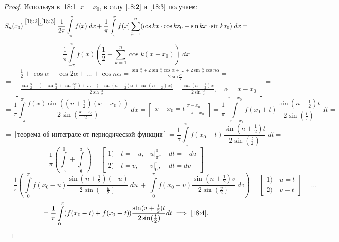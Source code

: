 \documentclass[../../main.tex]{subfiles}
\begin{document}
\begin{proof}
	Используя в \eqref{18:1} $x = x_0$, в силу $\eqref{18:2}$ и $\eqref{18:3}$ получаем:
	\[S_n(x_0) \stackrel{\eqref{18:2}, \eqref{18:3}}{=}
	\dfrac{1}{2\pi}\int\limits_{-\pi}^{\pi}{f(x)\; dx} + \dfrac{1}{\pi}
	\int\limits_{-\pi}^{\pi}{f(x)}\sum\limits_{k=1}^{n}
	(\cos{kx}\cdot \cos{kx}_0 + \sin{kx}\cdot \sin{kx}_0)\; dx = \]
	\[ = \dfrac{1}{\pi}\int\limits_{-\pi}^{\pi}f(x)\left(\dfrac{1}{2} + 
	\sum\limits_{k=1}^{n}\cos k(x-x_0)\right)\; dx =\]
	\[=\left[ 
	\begin{gathered} 
	\frac{1}{2} + \cos\alpha + \cos{2\alpha} + \ldots + \cos{n\alpha} =
	\frac{\sin\frac{\alpha}{2} + 2\sin{\frac{\alpha}{2}}\cos\alpha + \ldots +
	2\sin{\frac{\alpha}{2}}\cos{n \alpha}}{2\sin{\frac{\alpha}{2}}} =
	\\\frac{\sin{\frac{\alpha}{2} + (-\sin{\frac{\alpha}{2}}+
	\sin{\frac{3\alpha}{2}}) + \ldots + (-\sin(n-\frac{1}{2})\alpha + 
	\sin{(n + \frac{1}{2})\alpha)}}}{2\sin\frac{\alpha}{2}} = 
	\frac{\sin(n + \frac{1}{2})\alpha}{2\sin{\frac{\alpha}{2}}},\quad
	\alpha = x - x_0
	\end{gathered} 
	\right] = \]
	\[=\dfrac{1}{\pi}\int\limits_{-\pi}^{\pi}
	{\dfrac{f(x)\sin((n + \frac{1}{2})(x - x_0))}{2\sin\left(\frac{x-x_0}{2}\right)}}\; dx=
	\left[ 
	\begin{gathered} 
	x - x_0 = t\big|_{-\pi-x_0}^{\pi-x_0}
	\end{gathered} 
	\right]
	=\dfrac{1}{\pi}\int\limits_{-\pi-x_0}^{\pi - x_0}{f(x_0 + t)
	\dfrac{\sin(n + \frac{1}{2})t}{2\sin(\frac{t}{2})}}\; dt = \]
	\[=\left[
	\text{теорема об интеграле от периодической функции}
	\right] =
	\dfrac{1}{\pi}\int\limits_{-\pi}^{\pi}{f(x_0 + t)}
	\dfrac{\sin(n + \frac{1}{2})t}{2\sin(\frac{t}{2})}\; dt =\]
	\[= \dfrac{1}{\pi}\left(\int\limits_{-\pi}^{0} + \int\limits_{0}^{\pi}\right) =
	\left[ 
	\begin{aligned} 
	1)\ & t = -u,& u\big|_{\pi}^{0},\ &  dt = -du\\
	2)\ & t= v,& v\big|_{0}^{\pi},\ &  dt = dv
	\end{aligned} 
	\right] =\]
	\[= \dfrac{1}{\pi}\left(\int\limits_{0}^{\pi}{f(x_0 - u)
	\dfrac{\sin(n + \frac{1}{2})(-u)}{2\sin(-\frac{u}{2})}}\; du\ +\ 
	\int\limits_{0}^{\pi}{f(x_0 + v)\dfrac{\sin(n + \frac{1}{2})v}
	{2\sin(\frac{v}{2})}}\; dv\right)=
	\left[ 
	\begin{aligned} 
	1)\ & u = t\\
	2)\ & v = t
	\end{aligned} 
	\right] =
	\ldots =\]
	\[= \dfrac{1}{\pi}\int\limits_{0}^{\pi}(f(x_0 - t) + 
	f(x_0 + t))\dfrac{\sin(n + \frac{1}{2})t}{2\sin(\frac{t}{2})}dt
	\implies \eqref{18:4}. \qedhere\]
\end{proof}
\end{document}
